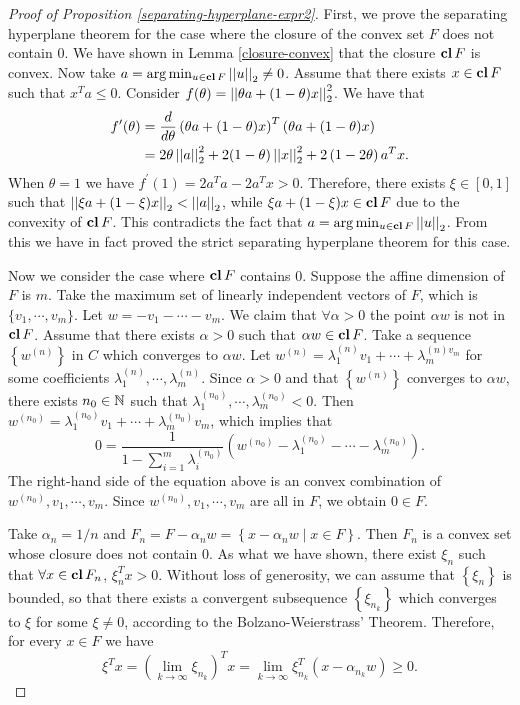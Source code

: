 \documentclass[12pt]{article}
\begin{document}
\begin{proof}[Proof of Proposition \ref{separating-hyperplane-expr2}]
    First, we prove the separating hyperplane theorem for the case where the closure of the convex set \(F\) does not contain \(0\). We have shown in Lemma \ref{closure-convex} that the closure \(\operatorname{\mathbf{cl}} F\) is convex. Now take \(a=\arg\min_{u\in\operatorname{\mathbf{cl}} F}\left|\left|u\right|\right|_2\neq 0\). Assume that there exists \(x\in\operatorname{\mathbf{cl}} F\) such that \(x^Ta\leqslant 0\). Consider \(f(\theta)=\left|\left|\theta a+(1-\theta)x\right|\right|_2^2\). We have that
    \[\begin{aligned}
        f^\prime(\theta)
        &=\frac{d}{d\theta}\left(\theta a+(1-\theta)x\right)^T\left(\theta a+(1-\theta)x\right)\\
        &=2\theta\left|\left|a\right|\right|_2^2+2(1-\theta)\left|\left|x\right|\right|_2^2+2\left(1-2\theta\right)a^Tx.
    \end{aligned}\]
    When \(\theta=1\) we have \(f^\prime(1)=2a^Ta-2a^Tx>0\). Therefore, there exists \(\xi\in[0,1]\) such that \(\left|\left|\xi a+(1-\xi)x\right|\right|_2<\left|\left|a\right|\right|_2\), while \(\xi a+(1-\xi)x\in\operatorname{\mathbf{cl}} F\) due to the convexity of \(\operatorname{\mathbf{cl}} F\). This contradicts the fact that \(a=\arg\min_{u\in\operatorname{\mathbf{cl}} F}\left|\left|u\right|\right|_2\). From this we have in fact proved the strict separating hyperplane theorem for this case.\par
    Now we consider the case where \(\operatorname{\mathbf{cl}} F\) contains \(0\). Suppose the affine dimension of \(F\) is \(m\). Take the maximum set of linearly independent vectors of \(F\), which is \(\{v_1,\cdots,v_m\}\). Let \(w=-v_1-\cdots-v_m\). We claim that \(\forall\alpha>0\) the point \(\alpha w\) is not in \(\operatorname{\mathbf{cl}} F\). Assume that there exists \(\alpha>0\) such that \(\alpha w\in\operatorname{\mathbf{cl}} F\). Take a sequence \(\left\{w^{(n)}\right\}\) in \(C\) which converges to \(\alpha w\). Let \(w^{(n)}=\lambda_1^{(n)}v_1+\cdots+\lambda_m^{(n)v_m}\) for some coefficients \(\lambda_1^{(n)},\cdots,\lambda_m^{(n)}\). Since \(\alpha>0\) and that \(\left\{w^{(n)}\right\}\) converges to \(\alpha w\), there exists \(n_0\in\mathbb N\) such that \(\lambda_1^{(n_0)},\cdots,\lambda_m^{(n_0)}<0\). Then \(w^{(n_0)}=\lambda_1^{(n_0)}v_1+\cdots+\lambda_m^{(n_0)}v_m\), which implies that
    \[0=\frac{1}{1-\sum_{i=1}^m\lambda_i^{(n_0)}}\left(w^{(n_0)}-\lambda_1^{(n_0)}-\cdots-\lambda_m^{(n_0)}\right).\]
    The right-hand side of the equation above is an convex combination of \(w^{(n_0)},v_1,\cdots,v_m\). Since \(w^{(n_0)},v_1,\cdots,v_m\) are all in \(F\), we obtain \(0\in F\).\par
    Take \(\alpha_n=1/n\) and \(F_n=F-\alpha_nw=\left\{x-\alpha_nw\mid x\in F\right\}\). Then \(F_n\) is a convex set whose closure does not contain \(0\). As what we have shown, there exist \(\xi_n\) such that \(\forall x\in\operatorname{\mathbf{cl}} F_n\), \(\xi_n^Tx>0\). Without loss of generosity, we can assume that \(\left\{\xi_n\right\}\) is bounded, so that there exists a convergent subsequence \(\left\{\xi_{n_k}\right\}\) which converges to \(\xi\) for some \(\xi\neq 0\), according to the Bolzano-Weierstrass' Theorem. Therefore, for every \(x\in F\) we have
    \[\xi^Tx=\left(\lim_{k\to\infty}\xi_{n_k}\right)^Tx=\lim_{k\to\infty}\xi_{n_k}^T\left(x-\alpha_{n_k}w\right)\geqslant 0.\]
\end{proof}
\end{document}
